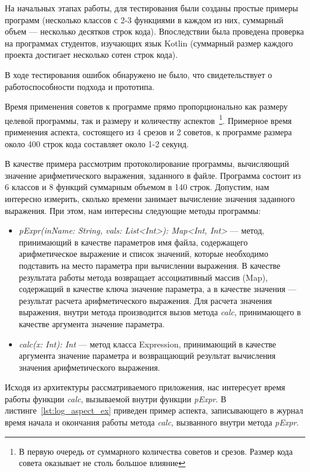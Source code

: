 \documentclass[conference]{IEEEtran}
\begin{document}
На начальных этапах работы, для тестирования были созданы простые примеры 
программ (несколько классов с 2-3 функциями в каждом из них, суммарный объем
--- несколько десятков строк кода).
Впоследствии была проведена проверка на программах студентов, изучающих язык
Kotlin (суммарный размер каждого проекта достигает несколько сотен строк кода).

В ходе тестирования ошибок обнаружено не было, что свидетельствует о
работоспособности подхода и прототипа.

Время применения советов к программе прямо пропорционально как размеру целевой
программы, так и размеру и количеству аспектов~\footnote{В первую очередь от
суммарного количества советов и срезов. Размер кода совета оказывает не столь
большое влияние}.
Примерное время применения аспекта, состоящего из 4 срезов и 2 советов, к
программе размера около 400 строк кода составляет около 1-2 секунд.

В качестве примера рассмотрим протоколирование программы, вычисляющий значение
арифметического выражения, заданного в файле.
Программа состоит из 6 классов и 8 функций суммарным объемом в 140 строк.
Допустим, нам интересно измерить, сколько времени занимает вычисление значения
заданного выражения.
При этом, нам интересны следующие методы программы:
\begin{itemize}
    \item \textit{pExpr(inName: String, vals: List<Int>): Map<Int, Int>} ---
          метод, принимающий в качестве параметров имя файла, содержащего
          арифметическое выражение и список значений, которые необходимо
          подставить на место параметра при вычислении выражения.
          В качестве результата работы метода возвращает ассоциативный массив
          (Map), содержащий в качестве ключа значение параметра, а в качестве
          значения --- результат расчета арифметического выражения.
          Для расчета значения выражения, внутри метода производится вызов
          метода \textit{calc}, принимающего в качестве аргумента значение
          параметра.
    \item \textit{calc(x: Int): Int} --- метод класса Expression, принимающий в
    	  качестве аргумента значение параметра и возвращающий результат
    	  вычисления значения арифметического выражения.
\end{itemize}

Исходя из архитектуры рассматриваемого приложения, нас интересует время работы
функции \textit{calc}, вызываемой внутри функции \textit{pExpr}.
В листинге~\ref{lst:log_aspect_ex} приведен пример аспекта, записывающего в
журнал время начала и окончания работы метода \textit{calc}, вызванного внутри
метода \textit{pExpr}.
\end{document}
